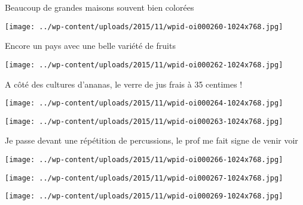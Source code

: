  Beaucoup de grandes maisons souvent bien colorées 

 

\begin{center} \texttt{[image: ../wp-content/uploads/2015/11/wpid-oi000260-1024x768.jpg]} \end{center}

 

 Encore un pays avec une belle variété de fruits 

 

\begin{center} \texttt{[image: ../wp-content/uploads/2015/11/wpid-oi000262-1024x768.jpg]} \end{center}

 

 A côté des cultures d'ananas, le verre de jus frais à 35 centimes ! 

 

\begin{center} \texttt{[image: ../wp-content/uploads/2015/11/wpid-oi000264-1024x768.jpg]} \end{center}

 

 

\begin{center} \texttt{[image: ../wp-content/uploads/2015/11/wpid-oi000263-1024x768.jpg]} \end{center}

 

 Je passe devant une répétition de percussions, le prof me fait signe de venir voir 

 

\begin{center} \texttt{[image: ../wp-content/uploads/2015/11/wpid-oi000266-1024x768.jpg]} \end{center}

 

 

\begin{center} \texttt{[image: ../wp-content/uploads/2015/11/wpid-oi000267-1024x768.jpg]} \end{center}

 

 

\begin{center} \texttt{[image: ../wp-content/uploads/2015/11/wpid-oi000269-1024x768.jpg]} \end{center}

